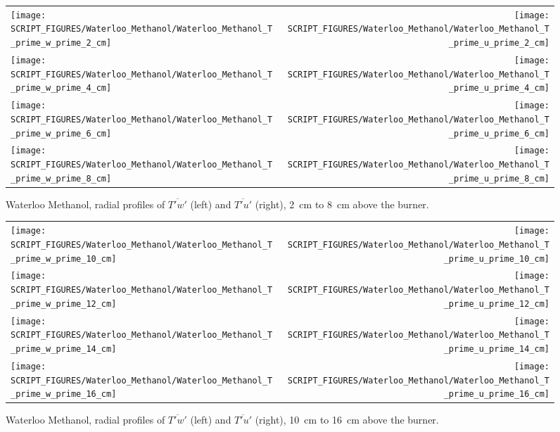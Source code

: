 \begin{figure}[p]
\begin{tabular*}{\textwidth}{l@{\extracolsep{\fill}}r}
\texttt{[image: SCRIPT\_FIGURES/Waterloo\_Methanol/Waterloo\_Methanol\_T\_prime\_w\_prime\_2\_cm]} &
\texttt{[image: SCRIPT\_FIGURES/Waterloo\_Methanol/Waterloo\_Methanol\_T\_prime\_u\_prime\_2\_cm]} \\
\texttt{[image: SCRIPT\_FIGURES/Waterloo\_Methanol/Waterloo\_Methanol\_T\_prime\_w\_prime\_4\_cm]} &
\texttt{[image: SCRIPT\_FIGURES/Waterloo\_Methanol/Waterloo\_Methanol\_T\_prime\_u\_prime\_4\_cm]} \\
\texttt{[image: SCRIPT\_FIGURES/Waterloo\_Methanol/Waterloo\_Methanol\_T\_prime\_w\_prime\_6\_cm]} &
\texttt{[image: SCRIPT\_FIGURES/Waterloo\_Methanol/Waterloo\_Methanol\_T\_prime\_u\_prime\_6\_cm]} \\
\texttt{[image: SCRIPT\_FIGURES/Waterloo\_Methanol/Waterloo\_Methanol\_T\_prime\_w\_prime\_8\_cm]} &
\texttt{[image: SCRIPT\_FIGURES/Waterloo\_Methanol/Waterloo\_Methanol\_T\_prime\_u\_prime\_8\_cm]}
\end{tabular*}
\caption[Waterloo Methanol, radial profiles of $\overline{T'w'}$ and $\overline{T'u'}$, 2~cm to 8~cm above the burner]
{Waterloo Methanol, radial profiles of $\overline{T'w'}$ (left) and $\overline{T'u'}$ (right), 2~cm to 8~cm above the burner.}
\label{Water_Methanol_Tpwp_1}
\end{figure}

\begin{figure}[p]
\begin{tabular*}{\textwidth}{l@{\extracolsep{\fill}}r}
\texttt{[image: SCRIPT\_FIGURES/Waterloo\_Methanol/Waterloo\_Methanol\_T\_prime\_w\_prime\_10\_cm]} &
\texttt{[image: SCRIPT\_FIGURES/Waterloo\_Methanol/Waterloo\_Methanol\_T\_prime\_u\_prime\_10\_cm]} \\
\texttt{[image: SCRIPT\_FIGURES/Waterloo\_Methanol/Waterloo\_Methanol\_T\_prime\_w\_prime\_12\_cm]} &
\texttt{[image: SCRIPT\_FIGURES/Waterloo\_Methanol/Waterloo\_Methanol\_T\_prime\_u\_prime\_12\_cm]} \\
\texttt{[image: SCRIPT\_FIGURES/Waterloo\_Methanol/Waterloo\_Methanol\_T\_prime\_w\_prime\_14\_cm]} &
\texttt{[image: SCRIPT\_FIGURES/Waterloo\_Methanol/Waterloo\_Methanol\_T\_prime\_u\_prime\_14\_cm]} \\
\texttt{[image: SCRIPT\_FIGURES/Waterloo\_Methanol/Waterloo\_Methanol\_T\_prime\_w\_prime\_16\_cm]} &
\texttt{[image: SCRIPT\_FIGURES/Waterloo\_Methanol/Waterloo\_Methanol\_T\_prime\_u\_prime\_16\_cm]}
\end{tabular*}
\caption[Waterloo Methanol, radial profiles of $\overline{T'w'}$ and $\overline{T'u'}$, 10~cm to 16~cm above the burner]
{Waterloo Methanol, radial profiles of $\overline{T'w'}$ (left) and $\overline{T'u'}$ (right), 10~cm to 16~cm above the burner.}
\label{Water_Methanol_Tpwp_2}
\end{figure}

